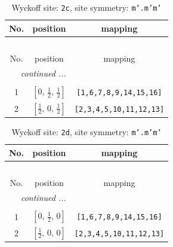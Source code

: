 \documentclass[fleqn,8pt]{jsarticle}
\begin{document}
\renewcommand{\arraystretch}{1.2}
\begin{longtable}{ccc}
\caption{Wyckoff site: {\tt 2c}, site symmetry: {\tt m'.m'm'}}
 \\
 \hline \hline
No. & position & mapping \\ \hline \endfirsthead

\multicolumn{2}{l}{\tablename\ \thetable{}} \\
 \hline \hline
No. & position & mapping \\ \hline \endhead

 \hline \hline
\multicolumn{2}{r}{\footnotesize\it continued ...} \\ \endfoot

 \hline \hline
\multicolumn{2}{r}{} \\ \endlastfoot

1 & $\left[ 0,\, \frac{1}{2},\, \frac{1}{2} \right]$ & {\tt [1,6,7,8,9,14,15,16]} \\ \hline
2 & $\left[ \frac{1}{2},\, 0,\, \frac{1}{2} \right]$ & {\tt [2,3,4,5,10,11,12,13]} \\
\end{longtable}
\renewcommand{\arraystretch}{1.2}
\begin{longtable}{ccc}
\caption{Wyckoff site: {\tt 2d}, site symmetry: {\tt m'.m'm'}}
 \\
 \hline \hline
No. & position & mapping \\ \hline \endfirsthead

\multicolumn{2}{l}{\tablename\ \thetable{}} \\
 \hline \hline
No. & position & mapping \\ \hline \endhead

 \hline \hline
\multicolumn{2}{r}{\footnotesize\it continued ...} \\ \endfoot

 \hline \hline
\multicolumn{2}{r}{} \\ \endlastfoot

1 & $\left[ 0,\, \frac{1}{2},\, 0 \right]$ & {\tt [1,6,7,8,9,14,15,16]} \\ \hline
2 & $\left[ \frac{1}{2},\, 0,\, 0 \right]$ & {\tt [2,3,4,5,10,11,12,13]} \\
\end{longtable}
\renewcommand{\arraystretch}{1.2}
\end{document}

